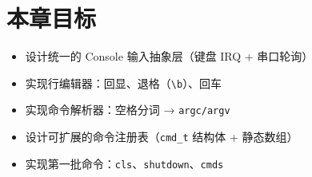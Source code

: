 \section{本章目标}

\begin{itemize}
  \item 设计统一的 Console 输入抽象层（键盘 IRQ + 串口轮询）
  \item 实现行编辑器：回显、退格（\texttt{\textbackslash b}）、回车
  \item 实现命令解析器：空格分词 → \texttt{argc/argv}
  \item 设计可扩展的命令注册表（\texttt{cmd\_t} 结构体 + 静态数组）
  \item 实现第一批命令：\texttt{cls}、\texttt{shutdown}、\texttt{cmds}
\end{itemize}


